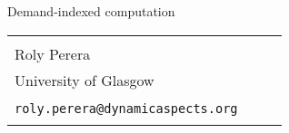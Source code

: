 \begin{frame}

{\huge{Demand-indexed computation}}

{\footnotesize
\begin{tabularx}{0.85\textwidth}{@{}XXX@{}}
\\
\\
Roly Perera \\
University of Glasgow
\\
\\
\tt{roly.perera@dynamicaspects.org} \\
\\
\end{tabularx}
}
\end{frame}
